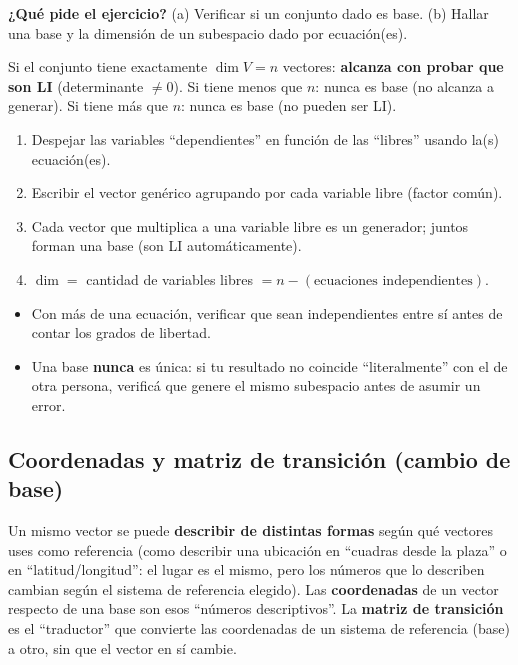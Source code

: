 \documentclass[11pt,a4paper]{article}
\newcommand{\qpide}[1]{\textbf{¿Qué pide el ejercicio?} #1\par}
\begin{document}
\qpide{(a) Verificar si un conjunto dado es base. (b) Hallar una base y la dimensión de un
subespacio dado por ecuación(es).}

\begin{proc}[Procedimiento (a)]
Si el conjunto tiene exactamente $\dim V=n$ vectores: \textbf{alcanza con probar que son
LI} (determinante $\neq0$). Si tiene menos que $n$: nunca es base (no alcanza a generar).
Si tiene más que $n$: nunca es base (no pueden ser LI).
\end{proc}

\begin{proc}[Procedimiento (b)]
\begin{enumerate}
    \item Despejar las variables ``dependientes'' en función de las ``libres'' usando la(s)
    ecuación(es).
    \item Escribir el vector genérico agrupando por cada variable libre (factor común).
    \item Cada vector que multiplica a una variable libre es un generador; juntos forman
    una base (son LI automáticamente).
    \item $\dim=$ cantidad de variables libres $= n - (\text{ecuaciones independientes})$.
\end{enumerate}
\end{proc}

\begin{atencion}
\begin{itemize}
    \item Con más de una ecuación, verificar que sean independientes entre sí antes de
    contar los grados de libertad.
    \item Una base \textbf{nunca} es única: si tu resultado no coincide ``literalmente''
    con el de otra persona, verificá que genere el mismo subespacio antes de asumir un
    error.
\end{itemize}
\end{atencion}

\subsection{Coordenadas y matriz de transición (cambio de base)}

\begin{intuicion}
Un mismo vector se puede \textbf{describir de distintas formas} según qué vectores uses
como referencia (como describir una ubicación en ``cuadras desde la plaza'' o en
``latitud/longitud'': el lugar es el mismo, pero los números que lo describen cambian
según el sistema de referencia elegido). Las \textbf{coordenadas} de un vector respecto de
una base son esos ``números descriptivos''. La \textbf{matriz de transición} es el
``traductor'' que convierte las coordenadas de un sistema de referencia (base) a otro,
sin que el vector en sí cambie.
\end{intuicion}
\end{document}
